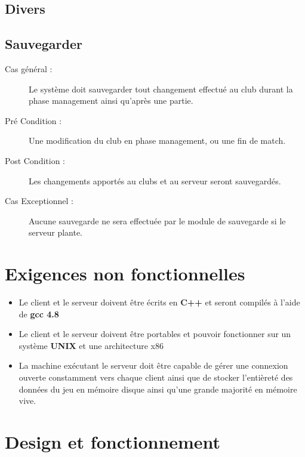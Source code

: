 \documentclass[a4paper]{report}
\begin{document}
\subsection{Divers}
\subsection{Sauvegarder}
\begin{description}
    \item[Cas général :] Le système doit sauvegarder tout changement effectué au \gls{club} durant la phase management ainsi qu'après une partie.
    \item[Pré Condition  :] Une modification du \gls{club} en phase management, ou une fin de match.
    \item[Post Condition :] Les changements apportés au \glspl{club} et au \gls{serveur} seront sauvegardés.
    \item[Cas Exceptionnel :] Aucune sauvegarde ne sera effectuée par le module de sauvegarde si le \gls{serveur} plante.
\end{description}


\section{Exigences non fonctionnelles}
\label{enf}
\begin{itemize}
    \item Le \gls{client} et le \gls{serveur} doivent être écrits en \textbf{C++} et seront compilés à l'aide de \textbf{gcc 4.8}
    \item Le \gls{client} et le \gls{serveur} doivent être portables et pouvoir fonctionner sur un système \textbf{UNIX} et une architecture x86
    \item La machine exécutant le \gls{serveur} doit être capable de gérer une connexion ouverte constamment vers chaque \gls{client} ainsi que de stocker l'entièreté des données du jeu en mémoire disque ainsi qu'une grande majorité en mémoire vive.
\end{itemize}


\section{Design et fonctionnement}
\end{document}
